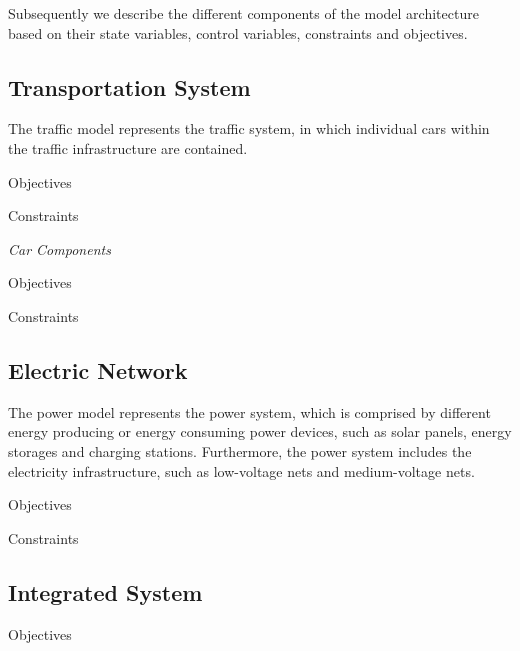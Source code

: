 Subsequently we describe the different components of the model architecture based on their state variables, control variables, constraints and objectives. 

\subsection{Transportation System}

The traffic model represents the traffic system, in which individual cars within the traffic infrastructure are contained.

Objectives

Constraints

\textit{Car Components}

Objectives

Constraints

\subsection{Electric Network}

The power model represents the power system, which is comprised by different energy producing or energy consuming power devices, such as solar panels, energy storages and charging stations. Furthermore, the power system includes the electricity infrastructure, such as low-voltage nets and medium-voltage nets.

Objectives

Constraints

\subsection{Integrated System}

Objectives